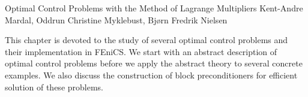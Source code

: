               {Optimal Control Problems with the Method of Lagrange Multipliers}
              {Kent-Andre Mardal, Oddrun Christine Myklebust, Bj\o{}rn Fredrik Nielsen}

\editornote{[mardal-3]}

This chapter is devoted to the study of several optimal control
problems and their implementation in FEniCS. We start with an abstract
description of optimal control problems before we apply the abstract
theory to several concrete examples. We also discuss the construction
of block preconditioners for efficient solution of these problems.

